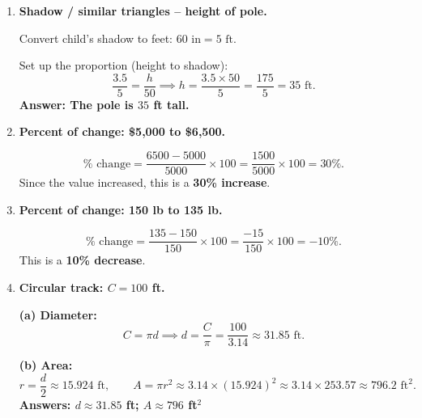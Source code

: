 \documentclass[11pt]{article}
\begin{document}
\begin{enumerate}[leftmargin=*, label=\textbf{\arabic*.}]
  The rectangles are similar. Match corresponding sides:
  \[
    \frac{6}{m} = \frac{4}{3} \implies 4m = 18 \implies m = 4.5 \text{ ft.}
  \]

  \textit{Check: ratio of widths $= \dfrac{6}{4.5} = \dfrac{4}{3}$ = ratio of heights. \checkmark}

  \textbf{Answer: $m = 4.5$ ft}

\vspace{0.3cm}
\item \textbf{Shadow / similar triangles -- height of pole.}

  Convert child's shadow to feet: $60 \text{ in} = 5 \text{ ft}$.

  Set up the proportion (height to shadow):
  \[
    \frac{3.5}{5} = \frac{h}{50} \implies h = \frac{3.5 \times 50}{5} = \frac{175}{5} = 35 \text{ ft.}
  \]
  \textbf{Answer: The pole is $35$ ft tall.}

\vspace{0.3cm}
\item \textbf{Percent of change: \$5{,}000 to \$6{,}500.}

  \[
    \% \text{ change} = \frac{6500 - 5000}{5000} \times 100 = \frac{1500}{5000} \times 100 = 30\%.
  \]
  Since the value increased, this is a \textbf{30\% increase}.

\vspace{0.3cm}
\item \textbf{Percent of change: 150 lb to 135 lb.}

  \[
    \% \text{ change} = \frac{135 - 150}{150} \times 100 = \frac{-15}{150} \times 100 = -10\%.
  \]
  This is a \textbf{10\% decrease}.

\vspace{0.3cm}
\item \textbf{Circular track: $C = 100$ ft.}

  \textbf{(a) Diameter:}
  \[
    C = \pi d \implies d = \frac{C}{\pi} = \frac{100}{3.14} \approx 31.85 \text{ ft.}
  \]

  \textbf{(b) Area:}
  \[
    r = \frac{d}{2} \approx 15.924 \text{ ft}, \qquad A = \pi r^2 \approx 3.14 \times (15.924)^2 \approx 3.14 \times 253.57 \approx 796.2 \text{ ft}^2.
  \]
  \textbf{Answers: $d \approx 31.85$ ft; $A \approx 796$ ft$^2$}


\end{enumerate}
\end{document}
